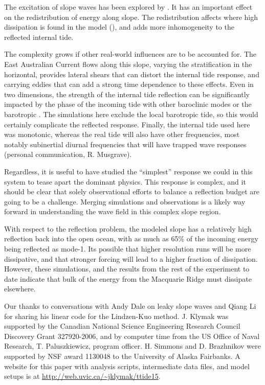 \documentclass[10pt]{article}
\begin{document}
The excitation of slope waves has been explored by \citet{daleetal01}. It has an important effect on the redistribution of energy along slope.  The redistribution affects where high dissipation is found in the model (), and adds more inhomogeneity to the reflected internal tide.    

The complexity grows if other real-world influences are to be accounted for.  The East Australian Current flows along this slope, varying the stratification in the horizontal, provides lateral shears that can distort the internal tide response, and carrying eddies that can add a strong time dependence to these effects.  Even in two dimensions, the strength of the  internal tide reflection can be significantly impacted by the phase of the incoming tide with other baroclinic modes \citet{klymaketal11a} or the barotropic \citep{kellynash10}.
The simulations here exclude the local barotropic tide, so this would certainly complicate the reflected response.  Finally, the internal tide used here was monotonic, whereas the real tide will also have other frequencies, most notably subinertial diurnal frequencies that will have trapped wave responses (personal communication, R. Musgrave).  

Regardless, it is useful to have studied the ``simplest'' response we could in this system to tease apart the dominant physics.  This response is complex, and it should be clear that solely observational efforts to balance a reflection budget are going to be a challenge.  Merging simulations and observations is a likely way forward in understanding the wave field in this complex slope region.

With respect to the reflection problem, the modeled slope has a relatively high reflection back into the open ocean, with as much as 65\% of the incoming energy being reflected as mode-1.  Its possible that higher resolution runs will be more dissipative, and that stronger forcing will lead to a higher fraction of dissipation.  However, these simulations, and the results from the rest of the experiment to date \citep[i.e.][]{johnstonetal15} indicate that bulk of the energy from the Macquarie Ridge must dissipate elsewhere.  

\begin{acknowledgment} 
Our thanks to conversations with Andy Dale on leaky slope waves and Qiang Li for sharing his linear code for the Lindzen-Kuo method.  
J. Klymak was supported by the Canadian National Science Engineering Research Council Discovery Grant 327920-2006, and by computer time from the US Office of Naval Research, T. Paluszkiewicz, program officer.  H. Simmons and D. Brazhnikov were supported by NSF award 1130048 to the University of Alaska Fairbanks.  A website for this paper with analysis scripts, intermediate data files, and model setups is at \url{http://web.uvic.ca/~jklymak/ttide15}.  

\end{acknowledgment}
\end{document}
